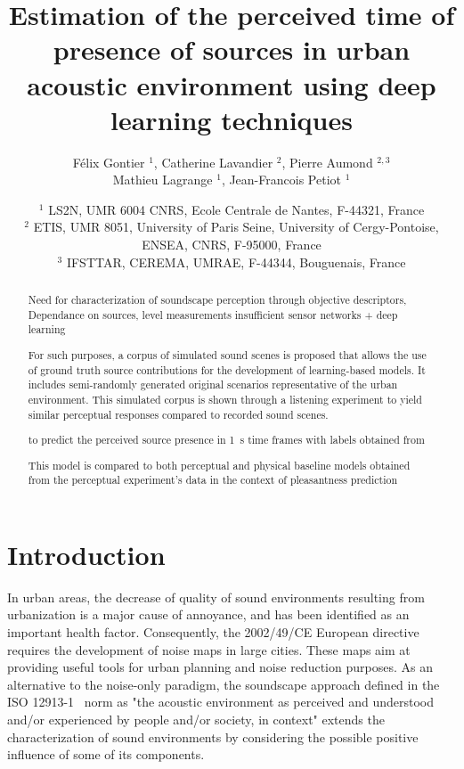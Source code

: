 \documentclass[11pt,a4paper]{article}
\begin{document}
\author{F\'elix Gontier $^1$, Catherine Lavandier $^2$, Pierre Aumond $^{2, 3}$\\Mathieu Lagrange $^1$, Jean-Francois Petiot $^1$}
\date{
$^1$ LS2N, UMR 6004 CNRS, Ecole Centrale de Nantes, F-44321, France\\
$^2$ ETIS, UMR 8051, University of Paris Seine, University of Cergy-Pontoise, ENSEA, CNRS, F-95000, France\\
$^3$ IFSTTAR, CEREMA, UMRAE, F-44344, Bouguenais, France
}
\title{Estimation of the perceived time of presence of sources in urban acoustic environment using deep learning techniques}
\maketitle


\begin{abstract}
Need for characterization of soundscape perception through objective descriptors, 
Dependance on sources, level measurements insufficient
sensor networks + deep learning

For such purposes, a corpus of simulated sound scenes is proposed that allows the use of ground truth source contributions for the development of learning-based models. It includes semi-randomly generated original scenarios representative of the urban environment. This simulated corpus is shown through a listening experiment to yield similar perceptual responses compared to recorded sound scenes.

to predict the perceived source presence in 1~s time frames with labels obtained from 

This model is compared to both perceptual and physical baseline models obtained from the perceptual experiment's data in the context of pleasantness prediction
\end{abstract}


\section{Introduction}
\label{sec:intro}
In urban areas, the decrease of quality of sound environments resulting from urbanization is a major cause of annoyance, and has been identified as an important health factor. Consequently, the 2002/49/CE European directive~\cite{ec2002} requires the development of noise maps in large cities. These maps aim at providing useful tools for urban planning and noise reduction purposes. As an alternative to the noise-only paradigm, the soundscape approach defined in the ISO 12913-1~\cite{iso2014} norm as "the acoustic environment as perceived and understood and/or experienced by people and/or society, in context" extends the characterization of sound environments by considering the possible positive influence of some of its components.
\end{document}
